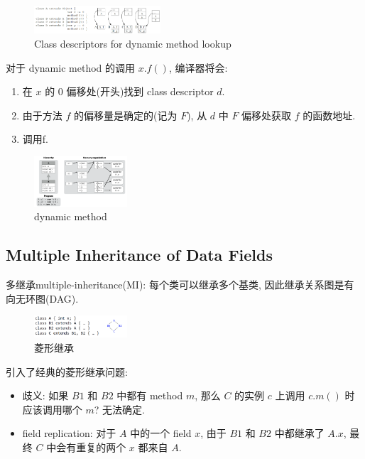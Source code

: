 \begin{figure}[!htb]
    \centering
    \includegraphics[width=0.42\textwidth]{pic/CP14/Class descriptors for dynamic method lookup}
    \caption{Class descriptors for dynamic method lookup}
\end{figure}

对于 dynamic method 的调用 $x.f()$, 编译器将会: 
\begin{enumerate}
    \item 在 $x$ 的 0 偏移处(开头)找到 class descriptor $d$.
    \item 由于方法 $f$ 的偏移量是确定的(记为 $F$), 从 $d$ 中 $F$ 偏移处获取 $f$ 的函数地址. 
    \item 调用f.
\end{enumerate}

\begin{figure}[!htb]
    \centering
    \includegraphics[width=0.309\textwidth]{pic/CP14/dynamic method}
    \caption{dynamic method}
\end{figure}


\subsection{Multiple Inheritance of Data Fields}
多继承multiple-inheritance(MI): 每个类可以继承多个基类, 因此继承关系图是有向无环图(DAG). %

\begin{figure}[!htb]
    \centering
    \includegraphics[width=0.309\textwidth]{pic/CP14/菱形继承}
    \caption{菱形继承}
\end{figure}


引入了经典的菱形继承问题: 
\begin{itemize}
    \item 歧义: 如果 $B1$ 和 $B2$ 中都有 method $m$, 那么 $C$ 的实例 $c$ 上调用 $c.m()$ 时应该调用哪个 $m$? 无法确定. 
    \item field replication: 对于 $A$ 中的一个 field $x$, 由于 $B1$ 和 $B2$ 中都继承了 $A.x$, 最终 $C$ 中会有重复的两个 $x$ 都来自 $A$.
\end{itemize}


